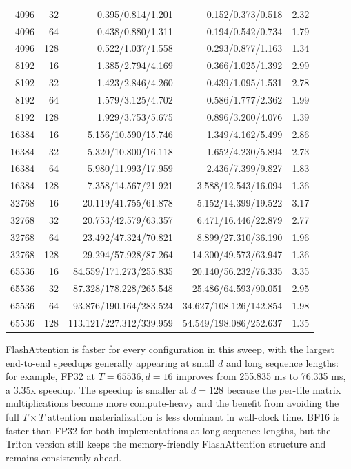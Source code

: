 \documentclass[11pt]{article}
\begin{document}
{\begin{longtable}{rrrrr}
  4096 & 32 & 0.395/0.814/1.201 & 0.152/0.373/0.518 & 2.32 \\
  4096 & 64 & 0.438/0.880/1.311 & 0.194/0.542/0.734 & 1.79 \\
  4096 & 128 & 0.522/1.037/1.558 & 0.293/0.877/1.163 & 1.34 \\
  8192 & 16 & 1.385/2.794/4.169 & 0.366/1.025/1.392 & 2.99 \\
  8192 & 32 & 1.423/2.846/4.260 & 0.439/1.095/1.531 & 2.78 \\
  8192 & 64 & 1.579/3.125/4.702 & 0.586/1.777/2.362 & 1.99 \\
  8192 & 128 & 1.929/3.753/5.675 & 0.896/3.200/4.076 & 1.39 \\
  16384 & 16 & 5.156/10.590/15.746 & 1.349/4.162/5.499 & 2.86 \\
  16384 & 32 & 5.320/10.800/16.118 & 1.652/4.230/5.894 & 2.73 \\
  16384 & 64 & 5.980/11.993/17.959 & 2.436/7.399/9.827 & 1.83 \\
  16384 & 128 & 7.358/14.567/21.921 & 3.588/12.543/16.094 & 1.36 \\
  32768 & 16 & 20.119/41.755/61.878 & 5.152/14.399/19.522 & 3.17 \\
  32768 & 32 & 20.753/42.579/63.357 & 6.471/16.446/22.879 & 2.77 \\
  32768 & 64 & 23.492/47.324/70.821 & 8.899/27.310/36.190 & 1.96 \\
  32768 & 128 & 29.294/57.928/87.264 & 14.300/49.573/63.947 & 1.36 \\
  65536 & 16 & 84.559/171.273/255.835 & 20.140/56.232/76.335 & 3.35 \\
  65536 & 32 & 87.328/178.228/265.548 & 25.486/64.593/90.051 & 2.95 \\
  65536 & 64 & 93.876/190.164/283.524 & 34.627/108.126/142.854 & 1.98 \\
  65536 & 128 & 113.121/227.312/339.959 & 54.549/198.086/252.637 & 1.35 \\
  \bottomrule
\end{longtable}
}

FlashAttention is faster for every configuration in this sweep, with the largest end-to-end speedups generally appearing at small $d$ and long sequence lengths: for example, FP32 at $T=65536,d=16$ improves from 255.835 ms to 76.335 ms, a 3.35x speedup. The speedup is smaller at $d=128$ because the per-tile matrix multiplications become more compute-heavy and the benefit from avoiding the full $T\times T$ attention materialization is less dominant in wall-clock time. BF16 is faster than FP32 for both implementations at long sequence lengths, but the Triton version still keeps the memory-friendly FlashAttention structure and remains consistently ahead.
\end{document}
